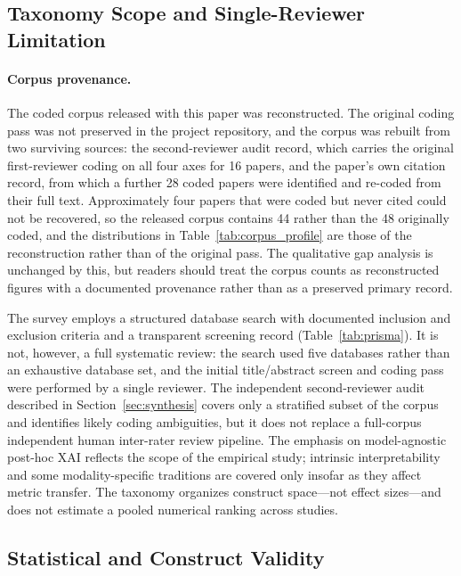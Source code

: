 \documentclass[twoside,11pt]{article}
\begin{document}
\subsection{Taxonomy Scope and Single-Reviewer Limitation}

\paragraph{Corpus provenance.} The coded corpus released with this paper was
reconstructed. The original coding pass was not preserved in the project
repository, and the corpus was rebuilt from two surviving sources: the
second-reviewer audit record, which carries the original first-reviewer coding
on all four axes for 16 papers, and the paper's own citation record, from which
a further 28 coded papers were identified and re-coded from their full text.
Approximately four papers that were coded but never cited could not be
recovered, so the released corpus contains 44 rather than the 48 originally
coded, and the distributions in Table~\ref{tab:corpus_profile} are those of the
reconstruction rather than of the original pass. The qualitative gap analysis is
unchanged by this, but readers should treat the corpus counts as reconstructed
figures with a documented provenance rather than as a preserved primary record.

The survey employs a structured database search with documented inclusion
and exclusion criteria and a transparent screening record
(Table~\ref{tab:prisma}). It is not, however, a full systematic review:
the search used five databases rather than an exhaustive database set,
and the initial title/abstract screen and coding pass were performed by a
single reviewer. The independent second-reviewer audit described in
Section~\ref{sec:synthesis} covers only a stratified subset of the corpus
and identifies likely coding ambiguities, but it does not replace a
full-corpus independent human inter-rater review pipeline.
The emphasis on model-agnostic post-hoc XAI reflects the scope of the
empirical study; intrinsic interpretability and some modality-specific
traditions are covered only insofar as they affect metric transfer. The
taxonomy organizes construct space---not effect sizes---and does not
estimate a pooled numerical ranking across studies.

\subsection{Statistical and Construct Validity}
\end{document}

